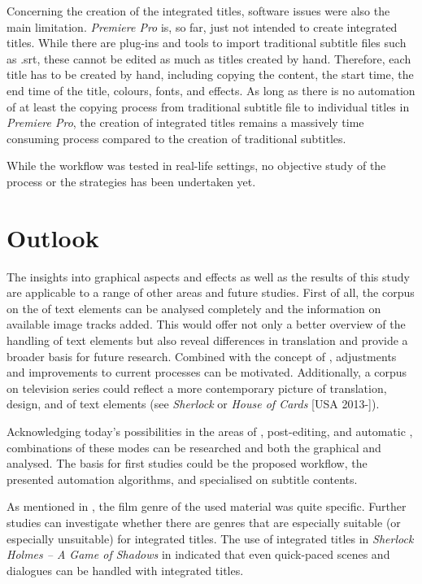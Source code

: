 Concerning the creation of the integrated titles, software issues were also the main limitation. \textit{Premiere Pro} is, so far, just not intended to create integrated titles. While there are plug-ins and tools to import traditional subtitle files such as .srt, these cannot be edited as much as titles created by hand. Therefore, each title has to be created by hand, including copying the content, the start time, the end time of the title, colours, fonts, and effects. As long as there is no automation of at least the copying process from traditional subtitle file to individual titles in \textit{Premiere Pro}, the creation of integrated titles remains a massively time consuming process compared to the creation of traditional subtitles.



While the workflow was tested in real-life settings, no objective study of the process or the strategies has been undertaken yet.


\section{Outlook}\label{sec:9.3}

The insights into graphical aspects and effects as well as the results of this study are applicable to a range of other areas and future studies. First of all, the corpus on the  of text elements can be analysed completely and the information on available image tracks added. This would offer not only a better overview of the handling of text elements but also reveal differences in translation and provide a broader basis for future research. Combined with the concept of , adjustments and improvements to current processes can be motivated. Additionally, a corpus on television series could reflect a more contemporary picture of translation, design, and  of text elements (see \textit{Sherlock} or \textit{House of Cards} [USA 2013-]).

Acknowledging today’s possibilities in the areas of , post-editing, and automatic , combinations of these modes can be researched and both the graphical and  analysed. The basis for first studies could be the proposed workflow, the presented automation algorithms, and  specialised on subtitle contents.

\newpage
As mentioned in , the film genre of the used material was quite specific. Further studies can investigate whether there are genres that are especially suitable (or especially unsuitable) for integrated titles. The use of integrated titles in \textit{Sherlock Holmes – A Game of Shadows} in \citet{Kruger????b} indicated that even quick-paced scenes and dialogues can be handled with integrated titles.


